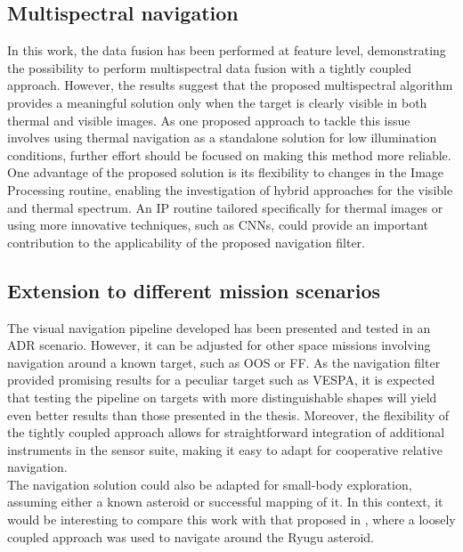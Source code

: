 \subsection*{Multispectral navigation}
In this work, the data fusion has been performed at feature level, demonstrating the possibility to perform multispectral data fusion with a tightly coupled approach. 
However, the results suggest that the proposed multispectral algorithm provides a meaningful solution only when the target is clearly visible in both thermal and visible images. As one proposed approach to tackle this issue involves using thermal navigation as a standalone solution for low illumination conditions, further effort should be focused on making this method more reliable. One advantage of the proposed solution is its flexibility to changes in the Image Processing routine, enabling the investigation of hybrid approaches for the visible and thermal spectrum. An IP routine tailored specifically for thermal images or using more innovative techniques, such as CNNs, could provide an important contribution to the applicability of the proposed navigation filter.

\subsection*{Extension to different mission scenarios}
The visual navigation pipeline developed has been presented and tested in an ADR scenario. However, it can be adjusted for other space missions involving navigation around a known target, such as OOS or FF. As the navigation filter provided promising results for a peculiar target such as VESPA, it is expected that testing the pipeline on targets with more distinguishable shapes will yield even better results than those presented in the thesis. Moreover, the flexibility of the tightly coupled approach allows for straightforward integration of additional instruments in the sensor suite, making it easy to adapt for cooperative relative navigation. \\
The navigation solution could also be adapted for small-body exploration, assuming either a known asteroid or successful mapping of it. In this context, it would be interesting to compare this work with that proposed in \cite{civardi2021small}, where a loosely coupled approach was used to navigate around the Ryugu asteroid.

\clearpage
\thispagestyle{empty}